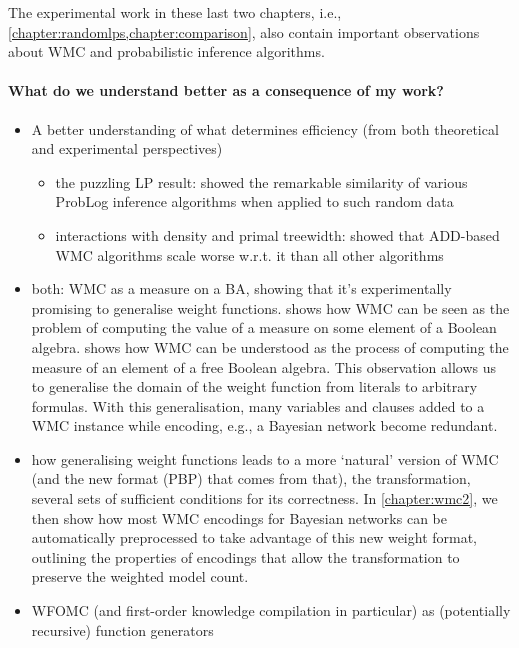 
The experimental work in these last two chapters, i.e., \cref{chapter:randomlps,chapter:comparison}, also contain important observations about WMC and probabilistic inference algorithms.

\paragraph{What do we understand better as a consequence of my work?}
\begin{itemize}
\item A better understanding of what determines efficiency (from both theoretical and experimental perspectives)
  \begin{itemize}
  \item the puzzling LP result: showed the remarkable similarity of various ProbLog inference algorithms when applied to such random data
  \item interactions with density and primal treewidth: showed that ADD-based WMC algorithms scale worse w.r.t. it than all other algorithms
  \end{itemize}
\item both: WMC as a measure on a BA, showing that it's experimentally promising to generalise weight functions.  shows how WMC can be seen as the problem of computing the value of a measure on some element of a Boolean algebra.  shows how WMC can be understood as the process of computing the measure of an element of a free Boolean algebra. This observation allows us to generalise the domain of the weight function from literals to arbitrary formulas. With this generalisation, many variables and clauses added to a WMC instance while encoding, e.g., a Bayesian network become redundant.
\item how generalising weight functions leads to a more `natural' version of WMC (and the new format (PBP) that comes from that), the transformation, several sets of sufficient conditions for its correctness. In \cref{chapter:wmc2}, we then show how most WMC encodings for Bayesian networks can be automatically preprocessed to take advantage of this new weight format, outlining the properties of encodings that allow the transformation to preserve the weighted model count.
\item WFOMC (and first-order knowledge compilation in particular) as (potentially recursive) function generators
\end{itemize}

